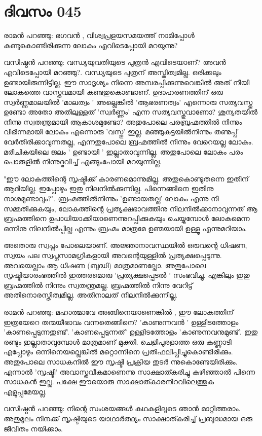 \newpage
\section{ദിവസം 045}


രാമന്‍ പറഞ്ഞു: ഭഗവന്‍ , വിശ്വപ്രളയസമയത്ത്‌ നാമിപ്പോള്‍ കണ്ടുകൊണ്ടിരിക്കുന്ന ലോകം എവിടെപ്പോയി മറയുന്നു?

വസിഷ്ഠന്‍ പറഞ്ഞു: വന്ധ്യയുവതിയുടെ പുത്രന്‍ എവിടെയാണ്‌? അവന്‍ എവിടെപ്പോയി മറഞ്ഞു?. വന്ധ്യയുടെ പുത്രന്‌ അസ്തിത്വമില്ല. ഒരിക്കലും ഉണ്ടായിരുന്നിട്ടില്ല. ഈ സാദൃശ്യം നിന്നെ അമ്പരപ്പിക്കുന്നുവെങ്കില്‍ അത്‌ നീയീ ലോകത്തെ വാസ്തവമായി കണ്ടതുകൊണ്ടാണ്‌. ഉദാഹരണത്തിന്‌ ഒരു സ്വര്‍ണ്ണമാലയില്‍ 'മാലത്വം '  അല്ലെങ്കിൽ 'ആഭരണത്വം' എന്നൊരു സത്യവസ്തു ഉണ്ടോ അതോ അതിലുള്ളത്‌ 'സ്വര്‍ണ്ണം' എന്ന സത്യവസ്തുവാണോ? ശൂന്യതയില്‍ നിന്നു സ്വതന്ത്രമായി ആകാശമുണ്ടോ? അതുപോലെ പരബ്രഹ്മത്തില്‍ നിന്നും വിഭിന്നമായി ലോകം എന്നൊരു 'വസ്തു' ഇല്ല. മഞ്ഞുകട്ടയില്‍നിന്നും തണുപ്പ്‌ വേര്‍തിരിക്കാവുന്നതല്ല, എന്നതുപോലെ ബ്രഹ്മത്തില്‍ നിന്നും വേറെയല്ല ലോകം. മരീചികയിലെ ജലം  ' ഉണ്ടായി '  ഇല്ലാതാവുന്നില്ല. അതുപോലെ ലോകം പരം പൊരുളില്‍ നിന്നുദ്ഭവിച്ച്‌ എങ്ങുംപോയി മറയുന്നില്ല. 

"ഈ ലോകത്തിന്റെ സൃഷ്ടിക്ക്‌ കാരണമൊന്നുമില്ല. അതുകൊണ്ടുതന്നെ ഇതിന്‌ ആദിയില്ല. ഇപ്പോഴും ഇതു നിലനില്‍ക്കുന്നില്ല. പിന്നെങ്ങിനെ ഇതിനു നാശമുണ്ടാവും?". ബ്രഹ്മത്തില്‍നിന്നും 'ഉണ്ടായതല്ല' ലോകം എന്നു നീ സമ്മതിക്കുകയും, ലോകത്തിന്റെ പ്രത്യക്ഷഭാവത്തിനു നിലനില്‍ക്കാനാവുന്നത്‌ ആ ബ്രഹ്മത്തിനെ ഉപാധിയാക്കിയാണെന്നുറപ്പിക്കുകയും ചെയ്യുമ്പോള്‍ ലോകമെന്ന ഒന്നിനു നിലനില്‍പ്പില്ല എന്നും ബ്രഹ്മം മാത്രമേ ഉണ്മയായി ഉള്ളൂ എന്നുമറിയാം.

അതൊരു സ്വപ്നം പോലെയാണ്‌. അജ്ഞാനാവസ്ഥയില്‍ ഒരുവന്റെ  ധിഷണ, സ്വയം പല സ്വപ്നസാമഗ്രികളായി അവന്റെയുള്ളില്‍ പ്രത്യക്ഷപ്പെടുന്നു. അവയെല്ലാം ആ ധിഷണ (ബുദ്ധി) മാത്രമാണല്ലോ. അതുപോലെ സൃഷ്ടിയാരംഭത്തില്‍ ഇത്തരമൊരു 'പ്രത്യക്ഷപ്പെടല്‍ ' സംഭവിച്ചു. എങ്കിലും ഇതു ബ്രഹ്മത്തില്‍ നിന്നും സ്വതന്ത്രമല്ല. ബ്രഹ്മത്തില്‍ നിന്നു വേറിട്ട്‌ അതിനൊരസ്തിത്വമില്ല. അതിനാലത്‌ നിലനില്‍ക്കുന്നില്ല.

രാമന്‍ പറഞ്ഞു: മഹാത്മാവേ അങ്ങിനെയാണെങ്കില്‍ , ഈ ലോകത്തിന്‌ ഇത്രയേറെ തന്മയീഭാവം വന്നതെങ്ങിനെ? 'കാണുന്നവന്‍ ' ഉള്ളിടത്തോളം 'കാണപ്പെടുന്നതുണ്ട്‌'. 'കാണപ്പെടുന്നത്‌' ഉള്ളിടത്തോളം 'കാണുന്നവനുമുണ്ട്‌'. ഇതു രണ്ടും ഇല്ലാതാവുമ്പോള്‍ മാത്രമാണ്‌ മുക്തി. ചെളിപുരളാത്ത ഒരു കണ്ണാടി എപ്പോഴും ഒന്നിനെയല്ലെങ്കില്‍ മറ്റൊന്നിനെ പ്രതിഫലിപ്പിച്ചുകൊണ്ടിരിക്കും. അതുപോലെ സാധകനില്‍ ഈ സൃഷ്ടി പ്രക്രിയ തുടര്‍ ന്നുകൊണ്ടേയിരിക്കും. എന്നാല്‍ 'സൃഷ്ടി' അവാസ്തവീകമാണെന്നു സാക്ഷാത്കരിച്ചു കഴിഞ്ഞാല്‍ പിന്നെ സാധകന്‍ ഇല്ല. പക്ഷേ ഈയൊരു സാക്ഷാത്കാരനിറവിലെത്തുക എളുപ്പമേയല്ല.

വസിഷ്ഠന്‍ പറഞ്ഞു: നിന്റെ സംശയങ്ങള്‍ കഥകളിലൂടെ ഞാന്‍ മാറ്റിത്തരാം. അതുമൂലം നിനക്ക്‌ സൃഷ്ടിയുടെ യാഥാര്‍ത്ഥ്യം സാക്ഷാത്കരിച്ച്‌ പ്രബുദ്ധമായ ഒരു ജീവിതം നയിക്കാം. 

